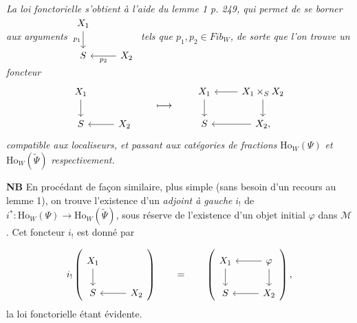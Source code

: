 \documentclass[11pt]{article}
\newcommand{\msp}[1]{\marginpar{\footnotesize [#1]}}
\newcommand{\Ho}{\mathrm{Ho}}
\begin{document}
\textit{La loi fonctorielle s'obtient à l'aide du lemme 1 p. 249, qui permet de se borner aux arguments $\begin{tikzcd}[ampersand replacement=\&] X_1 \arrow[d, "p_1"'] \& \\ S \& X_2 \arrow[l, "p_2"] \end{tikzcd}$ tels que $p_1,p_2\in \mathit{Fib}_W$, de sorte que l'on trouve un foncteur}
\[
\begin{tikzcd}[ampersand replacement=\&]
X_1 \arrow[d] \& \\
S \& X_2 \arrow[l]
\end{tikzcd}
\qquad\longmapsto\qquad
\begin{tikzcd}[ampersand replacement=\&]
X_1 \arrow[d] \& X_1\times_S X_2 \arrow[l] \arrow[d] \\
S \& X_2, \arrow[l]
\end{tikzcd}
\]
\textit{compatible aux localiseurs, et passant aux catégories de fractions} $\Ho_W(\Psi)$ \textit{et} $\Ho_W(\tilde{\Psi})$ \textit{respectivement.}

\textbf{NB} En procédant de façon similaire, plus simple (sans besoin d'un recours au lemme 1), on trouve l'existence d'un \textit{adjoint à gauche} $i_!$ de $i^* : \Ho_W(\Psi)\longrightarrow \Ho_W(\tilde{\Psi})$, sous réserve de l'existence d'un objet initial $\varphi$ dans $\mathcal{M}$. Cet foncteur $i_!$ est donné par %

\msp{page 255}
\[
i_!\left(
\begin{tikzcd}[ampersand replacement=\&]
X_1 \arrow[d] \& \\
S \& X_2 \arrow[l]
\end{tikzcd}
\right)
\qquad = \qquad
\left(
\begin{tikzcd}[ampersand replacement=\&]
X_1 \arrow[d] \& \varphi \arrow[l] \arrow[d] \\
S \& X_2 \arrow[l]
\end{tikzcd}
\right),
\]
la loi fonctorielle étant évidente.
\end{document}
